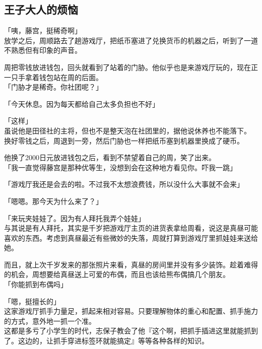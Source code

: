 \subsection{王子大人的烦恼}

「咦，藤宫，挺稀奇啊」\\

放学之后，周顺路去了趟游戏厅，把纸币塞进了兑换货币的机器之后，听到了一道不熟悉但有印象的声音。

周把零钱放进钱包，回头就看到了站着的门胁。他似乎也是来游戏厅玩的，现在正一只手拿着钱包站在周的后面。\\

「门胁才是稀奇。你社团呢？」

「今天休息。因为每天都给自己太多负担也不好」

「这样」\\

虽说他是田径社的主将，但也不是整天泡在社团里的，据他说休养也不能落下。\\

换好零钱之后，周退到一旁，然后门胁也一样把纸币塞到机器里换成了硬币。

他换了2000日元放进钱包之后，看到不禁望着自己的周，笑了出来。\\

「我一直觉得藤宫是那种优等生，没想到会在这种地方看见你。吓我一跳」

「游戏厅我还是会去的啦。不过我不太想浪费钱，所以没什么大事就不会来」

「嗯嗯。那今天为什么来了？」

「来玩夹娃娃了。因为有人拜托我弄个娃娃」\\

与其说是有人拜托，其实是千岁把游戏厅主页的进货表拿给周看，说这是真昼可能喜欢的东西。考虑到真昼最近有些微妙的失落，周就打算到游戏厅里抓娃娃来送给她。

而且，就上次千岁发来的那张照片来看，真昼的房间里并没有多少装饰。趁着难得的机会，周想要给真昼送上可爱的布偶，而且也该给熊布偶搞几个朋友。\\

「你能抓到布偶吗」

「嗯，挺擅长的」\\

这家游戏厅抓手力量足，抓起来相对容易。只要理解物体的重心和配置、抓手施力的方式，意外地一抓一个准。\\

这都是多亏了小学生的时代，志保子教会了他『这个啊，把抓手插进这里就能抓到了。这边的，让抓手穿进标签环就能搞定』等等各种各样的知识。

